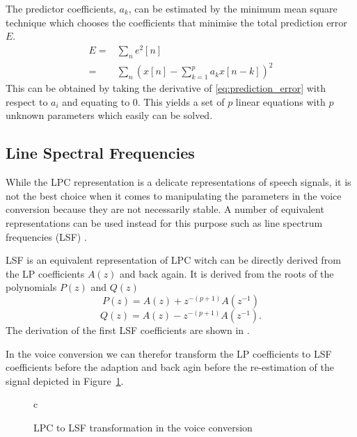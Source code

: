 The predictor coefficients, $a_k$, can be estimated by the minimum mean square technique which chooses the coefficients that minimise the total prediction error $E$.
\begin{equation}
	\label{eq:prediction_error}
	\begin{split}
		E = & \sum_{n}e^2[n]\\
		= & \sum_{n}\left( x[n]-\sum_{k=1}^{p}a_k x[n-k] \right)^2
	\end{split}
\end{equation}
This can be obtained by taking the derivative of \eqref{eq:prediction_error} with respect to $a_i$ and equating to $0$. This yields a set of $p$ linear equations with $p$ unknown parameters \cite{digsig} which easily can be solved.

\subsection{Line Spectral Frequencies} %
\label{sub:line_spectral_frequencies}
While the LPC representation is a delicate representations of speech signals, it is not the best choice when it comes to manipulating the parameters in the voice conversion because they are not necessarily stable. A number of equivalent representations can be used instead for this purpose such as line spectrum frequencies (LSF) \cite{taletek}.

LSF is an equivalent representation of LPC witch can be directly derived from the LP coefficients $A(z)$ and back again. It is derived from the roots of the polynomials $P(z)$ and $Q(z)$ 
\begin{equation}
	\label{eq:p_z}
	P(z) = A(z)+z^{-(p+1)}A(z^{-1})
\end{equation}
\begin{equation}
	\label{eq:q_z}
	Q(z) = A(z)-z^{-(p+1)}A(z^{-1}).
\end{equation}
The derivation of the first LSF coefficients are shown in \cite[p. 304]{taletek}.

In the voice conversion we can therefor transform the LP coefficients to LSF coefficients before the adaption and back agin before the re-estimation of the signal depicted in Figure~\ref{fig:lpc_to_lsf}.
 \begin{figure}[htbp]
  \centering
  \begin{tabular}[h]{c}
  \end{tabular}
  \caption{LPC to LSF transformation in the voice conversion}
  \label{fig:lpc_to_lsf}
\end{figure}

